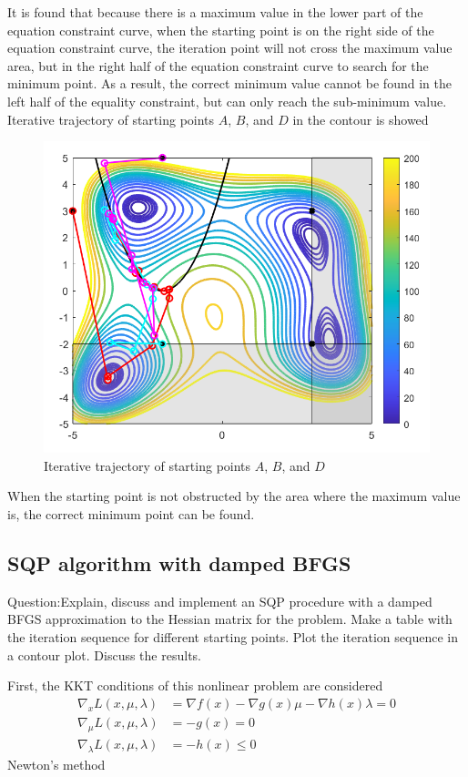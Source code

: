 It is found that because there is a maximum value in the lower part of the equation constraint curve, when the starting point is on the right side of the equation constraint curve, the iteration point will not cross the maximum value area, but in the right half of the equation constraint curve to search for the minimum point. As a result, the correct minimum value cannot be found in the left half of the equality constraint, but can only reach the sub-minimum value.
Iterative trajectory of starting points $A$, $B$, and $D$ in the contour is showed 
\begin{figure}[H]
\centering
\includegraphics[scale=0.5]{figures/fmincon_ABD.PNG}
\caption{Iterative trajectory of starting points $A$, $B$, and $D$}
\label{fig:labe5.4.4}
\end{figure}
When the starting point is not obstructed by the area where the maximum value is, the correct minimum point can be found.
\newpage
\subsection{\bfseries SQP algorithm with damped BFGS}
\begin{shaded}
{Question:Explain, discuss and implement an SQP procedure with a damped BFGS approximation to the Hessian matrix for the problem. Make a table with the iteration sequence for different starting points. Plot the iteration sequence in a
contour plot. Discuss the results.}
\end{shaded}
First, the KKT conditions of this nonlinear problem are considered
\begin{align*}
\nabla_x L(x,\mu,\lambda)&=\nabla f(x)-\nabla g(x)\mu-\nabla h(x) \lambda=0\tag{5.15}\\
\nabla_{\mu} L(x,\mu,\lambda)&=-g(x)=0\tag{5.16}\\
\nabla_{\lambda} L(x,\mu,\lambda)&=-h(x)\le 0\tag{5.17}
\end{align*}
Newton's method 

